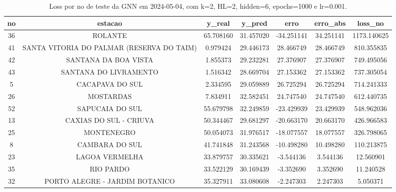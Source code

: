 \begin{table}[h]
\centering
\caption{Loss por no de teste da GNN em 2024-05-04, com k=2, HL=2, hidden=6, epochs=1000 e lr=0.001.}
\label{tab:gnn_loss_k2_hl2_h6_e1000_d20240504}
\begin{tabular}{ccccccc}
\toprule
no & estacao & y\_real & y\_pred & erro & erro\_abs & loss\_no \\
\midrule
36 & ROLANTE & 65.708160 & 31.457020 & -34.251141 & 34.251141 & 1173.140625 \\
41 & SANTA VITORIA DO PALMAR (RESERVA DO TAIM) & 0.979424 & 29.446173 & 28.466749 & 28.466749 & 810.355835 \\
42 & SANTANA DA BOA VISTA & 1.855373 & 29.232281 & 27.376907 & 27.376907 & 749.495056 \\
43 & SANTANA DO LIVRAMENTO & 1.516342 & 28.669704 & 27.153362 & 27.153362 & 737.305054 \\
5 & CACAPAVA DO SUL & 2.334595 & 29.059889 & 26.725294 & 26.725294 & 714.241333 \\
26 & MOSTARDAS & 7.834911 & 32.582451 & 24.747540 & 24.747540 & 612.440735 \\
52 & SAPUCAIA DO SUL & 55.679798 & 32.249859 & -23.429939 & 23.429939 & 548.962036 \\
13 & CAXIAS DO SUL - CRIUVA & 50.344467 & 29.681297 & -20.663170 & 20.663170 & 426.966583 \\
25 & MONTENEGRO & 50.054073 & 31.976517 & -18.077557 & 18.077557 & 326.798065 \\
8 & CAMBARA DO SUL & 41.741848 & 31.243568 & -10.498280 & 10.498280 & 110.213875 \\
23 & LAGOA VERMELHA & 33.879757 & 30.335621 & -3.544136 & 3.544136 & 12.560901 \\
35 & RIO PARDO & 33.522129 & 30.169439 & -3.352690 & 3.352690 & 11.240528 \\
32 & PORTO ALEGRE - JARDIM BOTANICO & 35.327911 & 33.080608 & -2.247303 & 2.247303 & 5.050371 \\
\bottomrule
\end{tabular}
\end{table}
